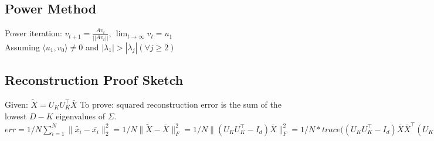 \subsection*{Power Method}
Power iteration: $v_{t+1} = \frac{Av_t}{||Av_t||}$, $\lim_{t \rightarrow \infty} v_t = u_1$\\
Assuming $\langle u_1, v_0 \rangle \not = 0$ and $|\lambda_1| > |\lambda_j| (\forall j \geq 2)$
\subsection*{Reconstruction Proof Sketch}
Given: $\tilde{X} = U_KU_K^{\top}\bar{X}$
To prove: squared reconstruction error is the sum of the lowest $D - K$ eigenvalues of $\Sigma$.
$err = 1/N\sum_{i=1}^{N}\|\tilde{x_i} - \bar{x_i}\|_2^2 = 1/N\|\tilde{X} - \bar{X}\|_F^2 = 1/N\|(U_KU_K^{\top} - I_d)\bar{X}\|_F^2 = 1/N* trace((U_KU_K^{\top} - I_d)\bar{X} \bar{X}^{\top}(U_KU_K^{\top} - I_d)^{\top} =  1/N*trace(([U_K;0] - U)\Lambda([U_K;0] - U)^{\top})$

